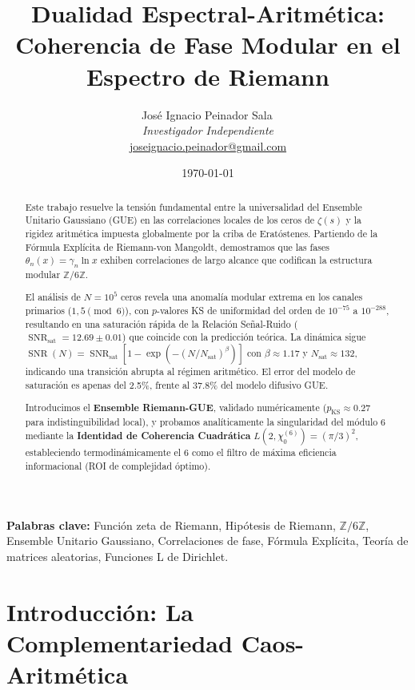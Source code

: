 \documentclass[12pt, a4paper]{article}
\title{\textbf{Dualidad Espectral-Aritmética: \\ 
Coherencia de Fase Modular en el Espectro de Riemann}}
\author{
  José Ignacio Peinador Sala\,\orcidlink{0009-0008-1822-3452} \\
  \textit{Investigador Independiente} \\
  \href{joseignacio.peinador@gmail.com}{joseignacio.peinador@gmail.com}
}
\date{\today}
\theoremstyle{plain}
\theoremstyle{definition}
\newcommand{\Z}{\mathbb{Z}}
\newcommand{\SNR}{\operatorname{SNR}}
\begin{document}
\maketitle

\begin{abstract}
Este trabajo resuelve la tensión fundamental entre la universalidad del Ensemble Unitario Gaussiano (GUE) en las correlaciones locales de los ceros de $\zeta(s)$ y la rigidez aritmética impuesta globalmente por la criba de Eratóstenes. Partiendo de la Fórmula Explícita de Riemann-von Mangoldt, demostramos que las fases $\theta_n(x) = \gamma_n \ln x$ exhiben correlaciones de largo alcance que codifican la estructura modular $\Z/6\Z$.

El análisis de $N=10^5$ ceros revela una anomalía modular extrema en los canales primarios ($1,5 \pmod{6}$), con $p$-valores KS de uniformidad del orden de $10^{-75}$ a $10^{-288}$, resultando en una saturación rápida de la Relación Señal-Ruido ($\SNR_{\text{sat}} = 12.69 \pm 0.01$) que coincide con la predicción teórica. La dinámica sigue $\SNR(N) = \SNR_{\text{sat}}[1 - \exp(-(N/N_{\text{sat}})^\beta)]$ con $\beta \approx 1.17$ y $N_{\text{sat}} \approx 132$, indicando una transición abrupta al régimen aritmético. El error del modelo de saturación es apenas del 2.5\%, frente al 37.8\% del modelo difusivo GUE.

Introducimos el \textbf{Ensemble Riemann-GUE}, validado numéricamente ($p_{\text{KS}} \approx 0.27$ para indistinguibilidad local), y probamos analíticamente la singularidad del módulo 6 mediante la \textbf{Identidad de Coherencia Cuadrática} $L(2,\chi_0^{(6)}) = (\pi/3)^2$, estableciendo termodinámicamente el 6 como el filtro de máxima eficiencia informacional (ROI de complejidad óptimo).
\end{abstract}

\textbf{Palabras clave:} Función zeta de Riemann, Hipótesis de Riemann, $\Z/6\Z$, Ensemble Unitario Gaussiano, Correlaciones de fase, Fórmula Explícita, Teoría de matrices aleatorias, Funciones L de Dirichlet.

\section{Introducción: La Complementariedad Caos-Aritmética}
\end{document}
